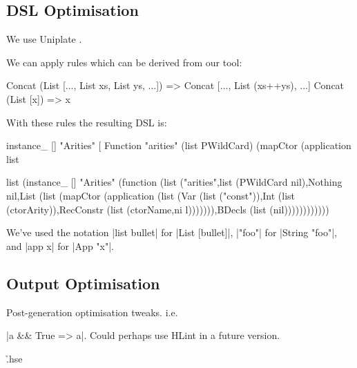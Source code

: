 \documentclass[preprint,draft]{sigplanconf}
\begin{document}
\subsection{DSL Optimisation}

We use Uniplate \cite{uniplate}.

We can apply rules which can be derived from our tool:

\begin{code}
Concat (List [..., List xs, List ys, ...]) => Concat [..., List (xs++ys), ...]
Concat (List [x]) => x
\end{code}

With these rules the resulting DSL is:

\begin{code}
instance_ [] "Arities" [
    Function "arities" (list PWildCard) (mapCtor (application list

list (instance_ [] "Arities" (function (list ("arities",list (PWildCard nil),Nothing nil,List (list (mapCtor (application
 (list (Var (list ("const")),Int (list (ctorArity)),RecConstr (list (ctorName,ni
l))))))),BDecls (list (nil))))))))))))\end{code}

We've used the notation |list bullet| for |List [bullet]|, |"foo"| for |String "foo"|, and |app x| for |App "x"|.

\subsection{Output Optimisation}
\label{sec:simplify}

Post-generation optimisation tweaks. i.e. \ignore|a && True => a|. Could perhaps use HLint in a future version.

\h{.hse}
\end{document}
